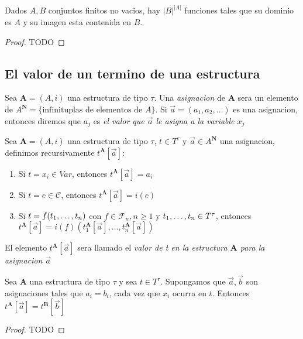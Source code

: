 \begin{lemma}
  Dados $A, B$ conjuntos finitos no vacios, hay $|B|^{|A|}$ funciones tales que su dominio es $A$ y 
  su imagen esta contenida en $B$.
\end{lemma}
\begin{proof}
  TODO
\end{proof}

\subsection{El valor de un termino de una estructura}
\begin{definition}
  Sea $\mathbf{A} = (A, i)$ una estructura de tipo $\tau$. Una \emph{asignacion} de $\mathbf{A}$ sera un elemento
  de $A^\mathbf{N} = \{\text{infinituplas de elementos de } A\}$. Si $\vec{a} = (a_1, a_2, \dots)$ es una asignacion,
  entonces diremos que $a_j$ es \emph{el valor que $\vec{a}$ le asigna a la variable $x_j$}
\end{definition}

\begin{definition}
  Sea $\mathbf{A} = (A, i)$ una estructura de tipo $\tau$, $t \in T^\tau$ y $\vec{a} \in A^\mathbf{N}$ una asignacion,
  definimos recursivamente $t^\mathbf{A}[\vec{a}]$: 
  \begin{enumerate}
    \item Si $t = x_i \in Var$, entonces $t^\mathbf{A}[\vec{a}] = a_i$
    \item Si $t = c \in \mathcal{C}$, entonces $t^\mathbf{A}[\vec{a}] = i(c)$
    \item Si $t = f(t_{1}, \dots, t_{n})$ con $f \in \mathcal{F}_n, n \geq 1$ y $t_{1}, \dots, t_{n} \in T^\tau$, entonces 
      $t^\mathbf{A}[\vec{a}] = i(f)(t_1^\mathbf{A}[\vec{a}], \dots, t_n^\mathbf{A}[\vec{a}])$
  \end{enumerate}

  El elemento $t^\mathbf{A}[\vec{a}]$ sera llamado el \emph{valor de t en la estructura $\mathbf{A}$ para la asignacion $\vec{a}$} 
\end{definition}

\begin{lemma}
  Sea $\mathbf{A}$ una estructura de tipo $\tau$ y sea $t \in T^\tau$. Supongamos que $\vec{a}, \vec{b}$ son asignaciones
  tales que $a_i = b_i$, cada vez que $x_i$ ocurra en $t$. Entonces $t^\mathbf{A}[\vec{a}] = t^\mathbf{B}[\vec{b}]$
\end{lemma}
\begin{proof}
  TODO
\end{proof}

